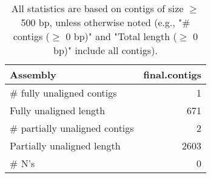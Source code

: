 \documentclass[12pt,a4paper]{article}
\begin{document}
\begin{table}[ht]
\begin{center}
\caption{All statistics are based on contigs of size $\geq$ 500 bp, unless otherwise noted (e.g., "\# contigs ($\geq$ 0 bp)" and "Total length ($\geq$ 0 bp)" include all contigs).}
\begin{tabular}{|l*{1}{|r}|}
\hline
Assembly & final.contigs \\ \hline
\# fully unaligned contigs & 1 \\ \hline
Fully unaligned length & 671 \\ \hline
\# partially unaligned contigs & 2 \\ \hline
Partially unaligned length & 2603 \\ \hline
\# N's & 0 \\ \hline
\end{tabular}
\end{center}
\end{table}
\end{document}

